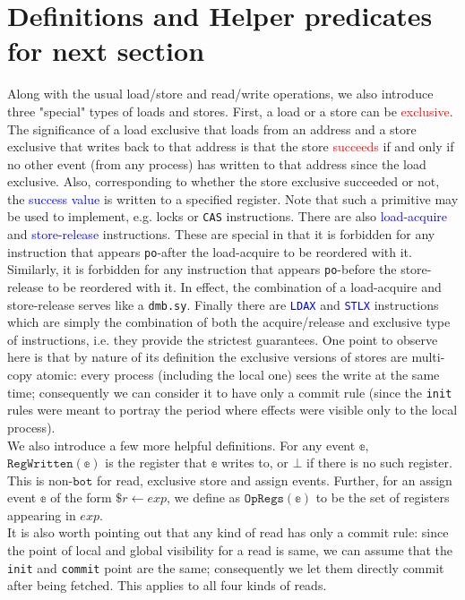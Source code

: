 \documentclass{article}
\newcommand{\var}{\texttt}
\begin{document}
\section{Definitions and Helper predicates for next section}
Along with the usual load/store and read/write operations, we also introduce three "special" types of loads and stores. First, a load or a store can be \textcolor{red}{exclusive}. The significance of a load exclusive that loads from an address and a store exclusive that writes back to that address is that the store \textcolor{red}{succeeds} if and only if no other event (from any process) has written to that address since the load exclusive. Also, corresponding to whether the store exclusive succeeded or not, the \textcolor{blue}{success value} is written to a specified register. Note that such a primitive may be used to implement, e.g. locks or \var{CAS} instructions. There are also \textcolor{blue}{load-acquire} and \textcolor{blue}{store-release} instructions. These are special in that it is forbidden for any instruction that appears \var{po}-after the load-acquire to be reordered with it. Similarly, it is forbidden for any instruction that appears \var{po}-before the store-release to be reordered with it. In effect, the combination of a load-acquire and store-release serves like a \var{dmb.sy}. Finally there are \textcolor{blue}{\var{LDAX}} and \textcolor{blue}{\var{STLX}} instructions which are simply the combination of both the acquire/release and exclusive type of instructions, i.e. they provide the strictest guarantees. One point to observe here is that by nature of its definition the exclusive versions of stores are multi-copy atomic: every process (including the local one) sees the write at the same time; consequently we can consider it to have only a commit rule (since the \var{init} rules were meant to portray the period where effects were visible only to the local process).\\
We also introduce a few more helpful definitions. For any event $\mathbb{e}$, $\var{RegWritten}(\mathbb{e})$ is the register that $\mathbb{e}$ writes to, or $\bot$ if there is no such register. This is non-$\var{bot}$ for read, exclusive store and assign events. Further, for an assign event $\mathbb{e}$ of the form $\$r \gets exp$, we define as $\var{OpRegs}(\mathbb{e})$ to be the set of registers appearing in $exp$.\\
It is also worth pointing out that any kind of read has only a commit rule: since the point of local and global visibility for a read is same, we can assume that the \var{init} and \var{commit} point are the same; consequently we let them directly commit after being fetched. This applies to all four kinds of reads.\\
\end{document}
